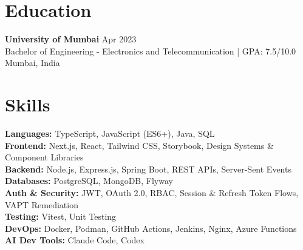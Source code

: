 \documentclass[a4paper,10pt]{article}
\begin{document}

\section*{Education}

\textbf{University of Mumbai} \hfill Apr 2023 \\
Bachelor of Engineering - Electronics and Telecommunication \quad | \quad GPA: 7.5/10.0 \hfill Mumbai, India


\section*{Skills}

\textbf{Languages:} TypeScript, JavaScript (ES6+), Java, SQL \\
\textbf{Frontend:} Next.js, React, Tailwind CSS, Storybook, Design Systems \& Component Libraries \\
\textbf{Backend:} Node.js, Express.js, Spring Boot, REST APIs, Server-Sent Events \\
\textbf{Databases:} PostgreSQL, MongoDB, Flyway \\
\textbf{Auth \& Security:} JWT, OAuth 2.0, RBAC, Session \& Refresh Token Flows, VAPT Remediation \\
\textbf{Testing:} Vitest, Unit Testing \\
\textbf{DevOps:} Docker, Podman, GitHub Actions, Jenkins, Nginx, Azure Functions \\
\textbf{AI Dev Tools:} Claude Code, Codex
\end{document}
